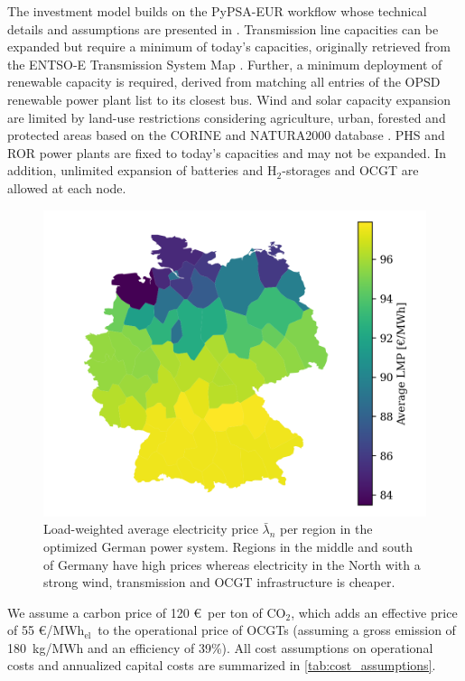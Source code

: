\documentclass[11pt,twocolumn]{article}
\newcommand{\averagelmp}[1][n]{\bar{\lambda}_{#1}}
\newcommand{\megawatthour}{MWh$_\text{el}$}
\begin{document}
The investment model builds on the PyPSA-EUR workflow \cite{horsch_jonas_pypsa-eur_2020} whose technical details and assumptions are presented in \cite{horsch_pypsa-eur_2018}. Transmission line capacities can be expanded but require a minimum of today's capacities, originally retrieved from the ENTSO-E Transmission System Map \cite{entso-e_entso-e_nodate}. Further, a minimum deployment of renewable capacity is required, derived from matching all entries of the OPSD renewable power plant list \cite{schlechtRenewablePowerPlants2020} to its closest bus. Wind and solar capacity expansion are limited by land-use restrictions considering agriculture, urban, forested and protected areas based on the CORINE and NATURA2000 database \cite{eea_corine_2012,eea_natura_2016}. \ac{PHS} and \ac{ROR} power plants are fixed to today's capacities and may not be expanded. In addition, unlimited expansion of batteries and H$_{2}$-storages and \ac{OCGT} are allowed at each node. 
% 
% 
\begin{figure}
    \centering
    \includegraphics[width=\linewidth]{de50/average_price}
    \caption{Load-weighted average electricity price $\averagelmp$ per region in the optimized German power system. Regions in the middle and south of Germany have high prices whereas electricity in the North with a strong wind, transmission and \ac{OCGT} infrastructure is cheaper.}
    \label{fig:average_price}
\end{figure}
We assume a carbon price of 120 \euro\, per ton of CO$_{2}$, which adds an effective price of 55 \euro/\megawatthour\, to the operational price of \acp{OCGT} (assuming a gross emission of 180~kg/MWh and an efficiency of 39\%). All cost assumptions on operational costs and annualized capital costs are summarized in \cref{tab:cost_assumptions}. 
\end{document}
